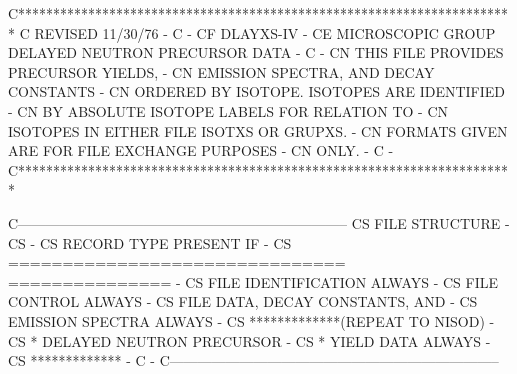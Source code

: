 \small
\begin{ccode}

C***********************************************************************
C                       REVISED 11/30/76                               -
C                                                                      -
CF          DLAYXS-IV                                                  -
CE          MICROSCOPIC GROUP DELAYED NEUTRON PRECURSOR DATA           -
C                                                                      -
CN                      THIS FILE PROVIDES PRECURSOR YIELDS,           -
CN                      EMISSION SPECTRA, AND DECAY CONSTANTS          -
CN                      ORDERED BY ISOTOPE.  ISOTOPES ARE IDENTIFIED   -
CN                      BY ABSOLUTE ISOTOPE LABELS FOR RELATION TO     -
CN                      ISOTOPES IN EITHER FILE ISOTXS OR GRUPXS.      -
CN                      FORMATS GIVEN ARE FOR FILE EXCHANGE PURPOSES   -
CN                      ONLY.                                          -
C                                                                      -
C***********************************************************************

C-----------------------------------------------------------------------
CS          FILE STRUCTURE                                             -
CS                                                                     -
CS             RECORD TYPE                        PRESENT IF           -
CS             ===============================    ===============      -
CS             FILE IDENTIFICATION                ALWAYS               -
CS             FILE CONTROL                       ALWAYS               -
CS             FILE DATA, DECAY CONSTANTS, AND                         -
CS                EMISSION SPECTRA                ALWAYS               -
CS   *************(REPEAT TO NISOD)                                    -
CS   *         DELAYED NEUTRON PRECURSOR                               -
CS   *            YIELD DATA                      ALWAYS               -
CS   *************                                                     -
C                                                                      -
C-----------------------------------------------------------------------


\end{ccode}
